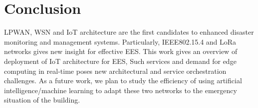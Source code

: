 \section{Conclusion} \label{sec:Conclusion}






\ac{LPWAN}, \ac{WSN} and \ac{IoT} architecture are the first candidates to enhanced disaster monitoring and management systems.
Particularly,
	IEEE802.15.4 and LoRa networks gives new insight for effective \ac{EES}.
This work gives an overview of deployment of \ac{IoT} architecture for \ac{EES},
Such services and demand for edge computing in real-time poses new architectural and service orchestration challenges.
As a future work,
	we plan to study the efficiency of using artificial intelligence/machine learning to adapt these two networks to the emergency situation of the building.




